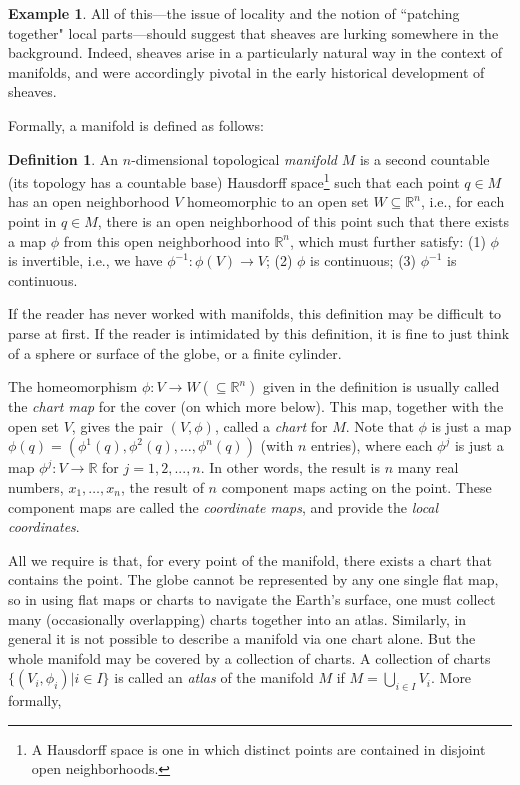 \documentclass[11pt]{book}
\theoremstyle{definition}
\newtheorem{example}{Example}[section]
\theoremstyle{definition}
\newtheorem{definition}{Definition}[section]
\theoremstyle{definition}
\theoremstyle{theorem}
\theoremstyle{definition}
\begin{document}
\begin{example}
	All of this---the issue of locality and the notion of ``patching together" local parts---should suggest that sheaves are lurking somewhere in the background. Indeed, sheaves arise in a particularly natural way in the context of manifolds, and were accordingly pivotal in the early historical development of sheaves.\par 
	Formally, a manifold is defined as follows: 
	\begin{definition} An $n$-dimensional topological \textit{manifold} $M$ is a second countable (its topology has a countable base) Hausdorff space\footnote{A Hausdorff space is one in which distinct points are contained in disjoint open neighborhoods.} such that each point $q \in M$ has an open neighborhood $V$ homeomorphic to an open set $W \subseteq \mathbb{R}^{n}$, i.e., for each point in $q \in M$, there is an open neighborhood of this point such that there exists a map $\phi$ from this open neighborhood into $\mathbb{R}^n$, which must further satisfy: (1) $\phi$ is invertible, i.e., we have $\phi^{-1}: \phi(V) \rightarrow V$; (2) $\phi$ is continuous; (3) $\phi^{-1}$ is continuous.
	\end{definition}  \noindent 
If the reader has never worked with manifolds, this definition may be difficult to parse at first. If the reader is intimidated by this definition, it is fine to just think of a sphere or surface of the globe, or a finite cylinder. \par 
The homeomorphism $\phi: V \rightarrow W (\subseteq \mathbb{R}^{n})$ given in the definition is usually called the \textit{chart map} for the cover (on which more below). This map, together with the open set $V$, gives the pair $(V, \phi)$, called a \textit{chart} for $M$. Note that $\phi$ is just a map $\phi(q) = (\phi^1 (q), \phi^2 (q),\dots, \phi^n (q))$ (with $n$ entries), where each $\phi^j$ is just a map $\phi^j : V \rightarrow \mathbb{R}$ for $j = 1, 2,..., n$. In other words, the result is $n$ many real numbers, $x_1, \dots,x_n$, the result of $n$ component maps acting on the point. These component maps are called the \textit{coordinate maps}, and provide the \textit{local coordinates}.
	\par  
	All we require is that, for every point of the manifold, there exists a chart that contains the point. The globe cannot be represented by any one single flat map, so in using flat maps or charts to navigate the Earth's surface, one must collect many (occasionally overlapping) charts together into an atlas. Similarly, in general it is not possible to describe a manifold via one chart alone. But the whole manifold may be covered by a collection of charts. A collection of charts $\{(V_i, \phi_i) | i \in I\}$ is called an \textit{atlas} of the manifold $M$ if $M = \bigcup_{i \in I} V_i$. More formally, 

\end{example}
\end{document}
